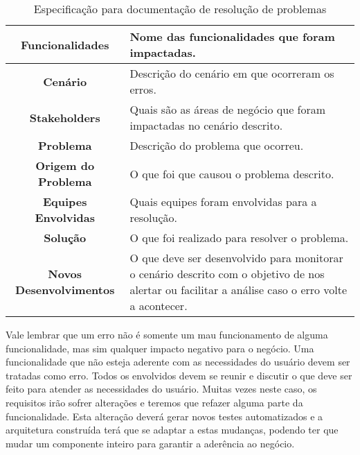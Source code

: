       \begin{table}[h!]
        \centering
        \begin{tabular}{|c|p{10cm}|}
          \hline
          \textbf{Funcionalidades} &
          Nome das funcionalidades que foram impactadas. \\ \hline
          \textbf{Cenário} &
          Descrição do cenário em que ocorreram os erros. \\ \hline
          \textbf{Stakeholders} &
          Quais são as áreas de negócio que foram impactadas no cenário descrito. \\ \hline
          \textbf{Problema} &
          Descrição do problema que ocorreu. \\ \hline
          \textbf{Origem do Problema} &
          O que foi que causou o problema descrito. \\ \hline
          \textbf{Equipes Envolvidas} &
          Quais equipes foram envolvidas para a resolução. \\ \hline
          \textbf{Solução} &
          O que foi realizado para resolver o problema. \\ \hline
          \textbf{Novos Desenvolvimentos} &
          O que deve ser desenvolvido para monitorar o cenário descrito com o
          objetivo de nos alertar ou facilitar a análise caso o erro volte a
          acontecer. \\ \hline
        \end{tabular}
        \caption{Especificação para documentação de resolução de problemas}
        \label{Tabela:12}
      \end{table}

      Vale lembrar que um erro não é somente um mau funcionamento de alguma
      funcionalidade, mas sim qualquer impacto negativo para o negócio. Uma
      funcionalidade que não esteja aderente com as necessidades do usuário devem
      ser tratadas como erro. Todos os envolvidos devem se reunir e discutir o que
      deve ser feito para atender as necessidades do usuário. Muitas vezes neste
      caso, os requisitos irão sofrer alterações e teremos que refazer alguma parte
      da funcionalidade. Esta alteração deverá gerar novos testes automatizados
      e a arquitetura construída terá que se adaptar a estas mudanças, podendo ter
      que mudar um componente inteiro para garantir a aderência ao negócio.

